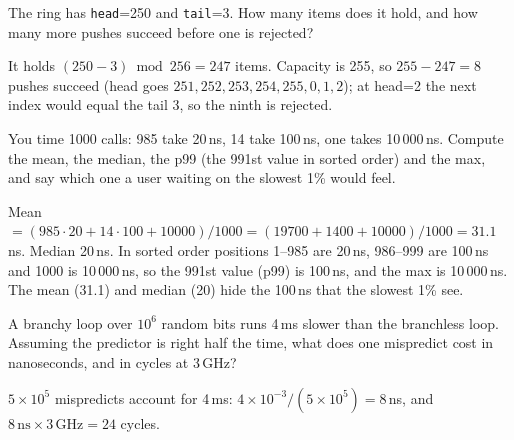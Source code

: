 \begin{exercise}[easy]
The ring has \texttt{head}=250 and \texttt{tail}=3. How many items does
it hold, and how many more pushes succeed before one is rejected?
\end{exercise}
\begin{solution}[hint]
It holds $(250-3)\bmod 256=247$ items. Capacity is 255, so $255-247=8$
pushes succeed (head goes $251,252,253,254,255,0,1,2$); at head=2 the next
index would equal the tail 3, so the ninth is rejected.
\end{solution}
\begin{exercise}[medium]
You time 1000 calls: 985 take 20\,ns, 14 take 100\,ns, one takes
10\,000\,ns. Compute the mean, the median, the p99 (the 991st value in sorted order) and the max, and say which
one a user waiting on the slowest 1\% would feel.
\end{exercise}
\begin{solution}[hint]
Mean $=(985\cdot20+14\cdot100+10000)/1000=(19700+1400+10000)/1000=31.1$\,ns.
Median 20\,ns. In sorted order positions 1--985 are 20\,ns, 986--999 are
100\,ns and 1000 is 10\,000\,ns, so the 991st value (p99) is 100\,ns, and
the max is 10\,000\,ns. The mean (31.1) and median (20) hide the
100\,ns that the slowest 1\% see.
\end{solution}
\begin{exercise}[medium]
A branchy loop over $10^{6}$ random bits runs 4\,ms slower than the
branchless loop. Assuming the predictor is right half the time, what
does one mispredict cost in nanoseconds, and in cycles at 3\,GHz?
\end{exercise}
\begin{solution}[hint]
$5\times10^{5}$ mispredicts account for 4\,ms: $4\times10^{-3}/(5\times10^{5})=8$\,ns,
and $8\,\mathrm{ns}\times3\,\mathrm{GHz}=24$ cycles.
\end{solution}
